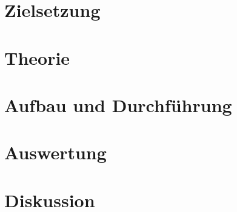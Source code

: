 

\setlength{\parindent}{0em}


%
%

\tableofcontents
\newpage

\section{Zielsetzung}



\section{Theorie}



\section{Aufbau und Durchführung}



\section{Auswertung}



\section{Diskussion}




%


\nocite{*}
\printbibliography

